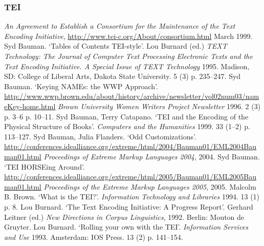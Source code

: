 \subsubsection[{TEI}]{TEI}\begin{bibitemlist}{1}
\label{AB-eg-02}\textit{An Agreement to Establish a Consortium for the Maintenance of the Text Encoding Initiative},  \url{http://www.tei-c.org/About/consortium.html} March 1999. 
\label{Bauman1995}Syd Bauman. ‘Tables of Contents TEI-style’. Lou Burnard (ed.) \textit{TEXT Technology: The Journal of Computer Text Processing} \textit{Electronic Texts and the Text Encoding Initiative. A Special Issue of TEXT Technology} 1995. Madison, SD: College of Liberal Arts, Dakota State University. 5  (3)  p. 235–247. 
\label{Bauman1996}Syd Bauman. ‘Keying NAMEs: the WWP Approach’.  \url{http://www.wwp.brown.edu/about/history/archive/newsletter/vol02num03/nameKey-home.html} \textit{Brown University Women Writers Project Newsletter} 1996. 2  (3)  p. 3–6 p. 10–11. 
\label{BaumanandCatapano1999}Syd Bauman, Terry Catapano. ‘TEI and the Encoding of the Physical Structure of Books’.  \textit{Computers and the Humanities} 1999. 33  (1–2)  p. 113–127. 
\label{BaumanandFlanders2004}Syd Bauman, Julia Flanders. ‘Odd Customizations’.  \url{http://conferences.idealliance.org/extreme/html/2004/Bauman01/EML2004Bauman01.html} \textit{Proceedings of Extreme Markup Languages 2004}, 2004. 
\label{Bauman2005}Syd Bauman. ‘TEI HORSEing Around’.  \url{http://conferences.idealliance.org/extreme/html/2005/Bauman01/EML2005Bauman01.html} \textit{Proceedings of the Extreme Markup Languages 2005}, 2005. 
\label{Brown1994}Malcolm B. Brown. ‘What is the TEI?’. \textit{Information Technology and Libraries} 1994. 13  (1)  p. 8. 
\label{Burnard1992}Lou Burnard. ‘The Text Encoding Initiative: A Progress Report’. Gerhard Leitner (ed.) \textit{New Directions in Corpus Linguistics}, 1992. Berlin: Mouton de Gruyter. 
\label{Burnard1993}Lou Burnard. ‘Rolling your own with the TEI’. \textit{Information Services and Use} 1993. Amsterdam: IOS Press. 13  (2)  p. 141–154. 

\end{bibitemlist}
